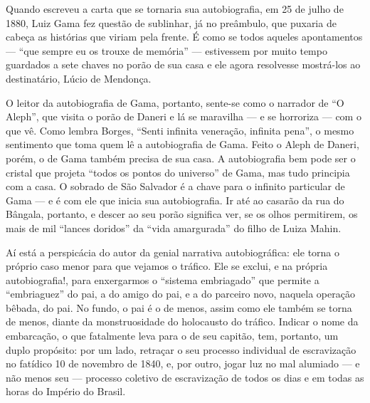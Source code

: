 \documentclass[11pt,a4paper]{article}
\newcommand{\asterisc}{\begin{center}\adforn{14}\end{center}}
\begin{document}
\asterisc

\begin{multicols}{2}

Quando escreveu a carta que se tornaria sua autobiografia, em 25 de julho de
1880, Luiz Gama fez questão de sublinhar, já no preâmbulo, que puxaria de
cabeça as histórias que viriam pela frente. É como se todos aqueles
apontamentos — ``que sempre eu os trouxe de memória'' — estivessem por muito
tempo guardados a sete chaves no porão de sua casa e ele agora resolvesse
mostrá-los ao destinatário, Lúcio de Mendonça. 

O leitor da autobiografia de Gama, portanto, sente-se como o narrador de ``O
Aleph'', que visita o porão de Daneri e lá se maravilha — e se horroriza —
com o que vê. Como lembra Borges, ``Senti infinita veneração, infinita
pena'', o mesmo sentimento que toma quem lê a autobiografia de Gama. Feito o
Aleph de Daneri, porém, o de Gama também precisa de sua casa. A autobiografia
bem pode ser o cristal que projeta ``todos os pontos do universo'' de Gama,
mas tudo principia com a casa.  O sobrado de São Salvador é a chave para o
infinito particular de Gama — e é com ele que inicia sua autobiografia. Ir
até ao casarão da rua do Bângala, portanto, e descer ao seu porão significa
ver, se os olhos permitirem, os mais de mil ``lances doridos'' da ``vida
amargurada'' do filho de Luiza Mahin. 
\end{multicols}



\asterisc

\begin{multicols}{2}

Aí está a perspicácia do autor da genial narrativa autobiográfica: ele torna o
próprio caso menor para que vejamos o tráfico. Ele se exclui, e na própria
autobiografia!, para enxergarmos o ``sistema embriagado'' que permite a
``embriaguez'' do pai, a do amigo do pai, e a do parceiro novo, naquela
operação bêbada, do pai. No fundo, o pai é o de menos, assim como ele também
se torna de menos, diante da monstruosidade do holocausto do tráfico. Indicar
o nome da embarcação, o que fatalmente leva para o de seu capitão, tem,
portanto, um duplo propósito: por um lado, retraçar o seu processo individual
de escravização no fatídico 10 de novembro de 1840, e, por outro, jogar luz
no mal alumiado — e não menos seu — processo coletivo de escravização de
todos os dias e em todas as horas do Império do Brasil.   
\end{multicols}
\end{document}
